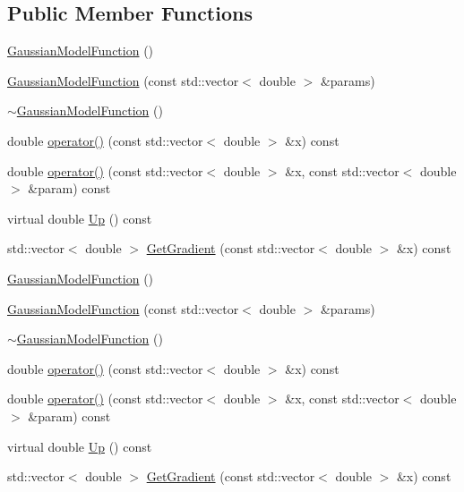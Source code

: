 \subsection*{Public Member Functions}
\begin{DoxyCompactItemize}
\item 
\mbox{\hyperlink{classROOT_1_1Minuit2_1_1GaussianModelFunction_aebecd6f3f9e7b6e7d6787f38cfc84cdc}{Gaussian\+Model\+Function}} ()
\item 
\mbox{\hyperlink{classROOT_1_1Minuit2_1_1GaussianModelFunction_ab766a76f32f2369508bde703519cc049}{Gaussian\+Model\+Function}} (const std\+::vector$<$ double $>$ \&params)
\item 
\mbox{\hyperlink{classROOT_1_1Minuit2_1_1GaussianModelFunction_abc4e84ccbc432e7706d8407c1d2efd6a}{$\sim$\+Gaussian\+Model\+Function}} ()
\item 
double \mbox{\hyperlink{classROOT_1_1Minuit2_1_1GaussianModelFunction_af4102c5eecd496d63c5592f7519248ce}{operator()}} (const std\+::vector$<$ double $>$ \&x) const
\item 
double \mbox{\hyperlink{classROOT_1_1Minuit2_1_1GaussianModelFunction_ab74ced8f50ef3831c8142de54877e726}{operator()}} (const std\+::vector$<$ double $>$ \&x, const std\+::vector$<$ double $>$ \&param) const
\item 
virtual double \mbox{\hyperlink{classROOT_1_1Minuit2_1_1GaussianModelFunction_ae99a5c50055e4563a2252ba8ceb19d20}{Up}} () const
\item 
std\+::vector$<$ double $>$ \mbox{\hyperlink{classROOT_1_1Minuit2_1_1GaussianModelFunction_ac81a3c5531a291b8a9c3af533de07195}{Get\+Gradient}} (const std\+::vector$<$ double $>$ \&x) const
\item 
\mbox{\hyperlink{classROOT_1_1Minuit2_1_1GaussianModelFunction_aebecd6f3f9e7b6e7d6787f38cfc84cdc}{Gaussian\+Model\+Function}} ()
\item 
\mbox{\hyperlink{classROOT_1_1Minuit2_1_1GaussianModelFunction_ab766a76f32f2369508bde703519cc049}{Gaussian\+Model\+Function}} (const std\+::vector$<$ double $>$ \&params)
\item 
\mbox{\hyperlink{classROOT_1_1Minuit2_1_1GaussianModelFunction_abc4e84ccbc432e7706d8407c1d2efd6a}{$\sim$\+Gaussian\+Model\+Function}} ()
\item 
double \mbox{\hyperlink{classROOT_1_1Minuit2_1_1GaussianModelFunction_af4102c5eecd496d63c5592f7519248ce}{operator()}} (const std\+::vector$<$ double $>$ \&x) const
\item 
double \mbox{\hyperlink{classROOT_1_1Minuit2_1_1GaussianModelFunction_ab74ced8f50ef3831c8142de54877e726}{operator()}} (const std\+::vector$<$ double $>$ \&x, const std\+::vector$<$ double $>$ \&param) const
\item 
virtual double \mbox{\hyperlink{classROOT_1_1Minuit2_1_1GaussianModelFunction_ae99a5c50055e4563a2252ba8ceb19d20}{Up}} () const
\item 
std\+::vector$<$ double $>$ \mbox{\hyperlink{classROOT_1_1Minuit2_1_1GaussianModelFunction_ac81a3c5531a291b8a9c3af533de07195}{Get\+Gradient}} (const std\+::vector$<$ double $>$ \&x) const
\end{DoxyCompactItemize}
